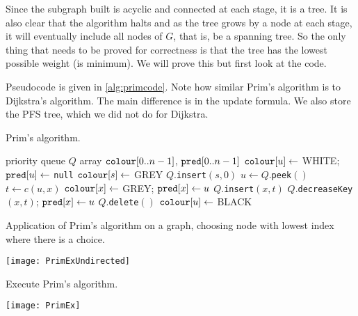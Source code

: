Since the subgraph built is acyclic and connected at each stage, it is a tree.
It is also clear that the algorithm halts and as the tree grows by a node at each stage, 
it will eventually include all nodes of $G$, that is, be a spanning tree. 
So the only thing that needs to be proved for correctness is that the tree has the lowest possible weight (is minimum). 
We will prove this but first look at the code.

Pseudocode is given in \cref{alg:primcode}. 
Note how similar Prim's algorithm is to Dijkstra's algorithm. 
The main difference is in the update formula. We also store the PFS tree, which we did not do for Dijkstra.

\begin{algorithm}[H]
  \caption{Prim's algorithm.}
  \label{alg:primcode}
\begin{algorithmic}[1]
	\State priority queue $Q$
	\State array $\operatorname{\text{\texttt{colour}}}[0..n-1]$, $\operatorname{\text{\texttt{pred}}}[0..n-1]$
		\State $\operatorname{\text{\texttt{colour}}}[u] \gets$ WHITE; $\operatorname{\text{\texttt{pred}}}[u] \gets$ \texttt{null} 
	\EndFor
	\State $\operatorname{\text{\texttt{colour}}}[s] \gets $ GREY
	\State $Q$.\texttt{insert}$(s, 0)$
		\State $u \gets Q$.\texttt{peek}$()$
			\State $t \gets c(u, x)$
				\State $\operatorname{\text{\texttt{colour}}}[x] \gets $ GREY; $\operatorname{\text{\texttt{pred}}}[x] \gets u$
				\State $Q$.\texttt{insert}$(x, t)$
				\State $Q$.\texttt{decreaseKey}$(x, t)$; $\operatorname{\text{\texttt{pred}}}[x] \gets u$
			\EndIf
		\EndFor
		\State $Q$.\texttt{delete}$()$
		\State $\operatorname{\text{\texttt{colour}}}[u] \gets $ BLACK
	\EndWhile
	\State \Return{$\pred$}
\EndFunction
\end{algorithmic}
\end{algorithm}


\begin{Boxample}
Application of Prim's algorithm on a graph, choosing node with lowest index where there is a choice.
\begin{center}
\texttt{[image: PrimExUndirected]}
\end{center}
\end{Boxample}

\begin{Boxample}[0.2]
Execute Prim's algorithm.\\

\begin{center}
\texttt{[image: PrimEx]}
\end{center}
\end{Boxample}

